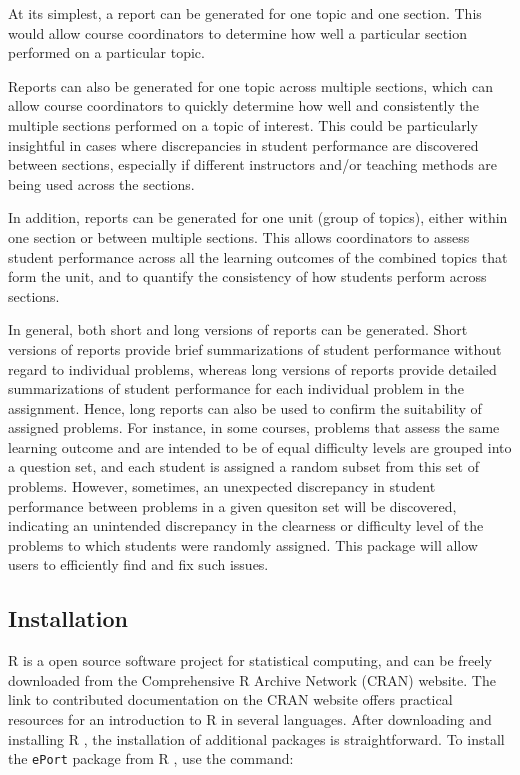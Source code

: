 \documentclass{article}\usepackage[]{graphicx}\usepackage[]{color}
\numberwithin{equation}{section} %
\newcommand{\pkg}[1]{{\texttt{#1}}}
\newcommand{\R}{{\normalfont\textsf{R }}{}}
\begin{document}
At its simplest, a report can be generated for one topic and one section. This would allow course coordinators to determine how well a particular section performed on a particular topic.

Reports can also be generated for one topic across multiple sections, which can allow course coordinators to quickly determine how well and consistently the multiple sections performed on a topic of interest. This could be particularly insightful in cases where discrepancies in student performance are discovered between sections, especially if different instructors and/or teaching methods are being used across the sections.

In addition, reports can be generated for one unit (group of topics), either within one section or between multiple sections. This allows coordinators to assess student performance across all the learning outcomes of the combined topics that form the unit, and to quantify the consistency of how students perform across sections.

In general, both short and long versions of reports can be generated. Short versions of reports provide brief summarizations of student performance without regard to individual problems, whereas long versions of reports provide detailed summarizations of student performance for each individual problem in the assignment. Hence, long reports can also be used to confirm the suitability of assigned problems. For instance, in some courses, problems that assess the same learning outcome and are intended to be of equal difficulty levels are grouped into a question set, and each student is assigned a random subset from this set of problems. However, sometimes, an unexpected discrepancy in student performance between problems in a given quesiton set will be discovered, indicating an unintended discrepancy in the clearness or difficulty level of the problems to which students were randomly assigned. This package will allow users to efficiently find and fix such issues. 

\subsection{Installation}

\R is a open source software project for statistical computing, and can be freely downloaded from the Comprehensive R Archive Network (CRAN) website. The link to contributed documentation on the CRAN website offers practical resources for an introduction to \R in several languages. After downloading and installing \R, the installation of additional packages is straightforward. To install the \pkg{ePort} package from \R, use the command:
\end{document}

